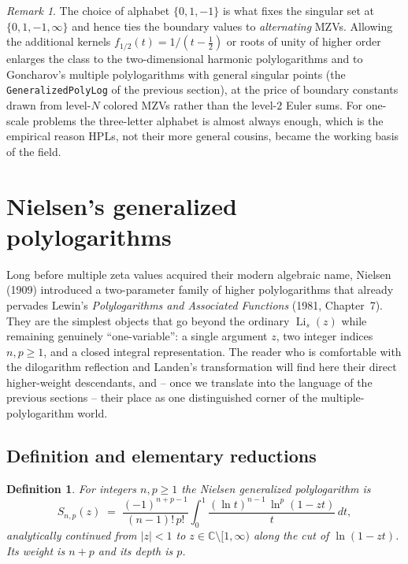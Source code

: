 \documentclass[11pt]{article}
\DeclareMathOperator{\Li}{Li}
\theoremstyle{plain}
\newtheorem{definition}[theorem]{Definition}
\theoremstyle{remark}
\newtheorem{remark}[theorem]{Remark}
\begin{document}
\begin{remark}
The choice of alphabet $\{0,1,-1\}$ is what fixes the singular set at $\{0,1,-1,\infty\}$ and hence ties the boundary values to \emph{alternating} MZVs. Allowing the additional kernels $f_{1/2}(t)=1/(t-\tfrac12)$ or roots of unity of higher order enlarges the class to the two-dimensional harmonic polylogarithms and to Goncharov's multiple polylogarithms with general singular points (the \texttt{GeneralizedPolyLog} of the previous section), at the price of boundary constants drawn from level-$N$ colored MZVs rather than the level-$2$ Euler sums. For one-scale problems the three-letter alphabet is almost always enough, which is the empirical reason HPLs, not their more general cousins, became the working basis of the field.
\end{remark}


\section{Nielsen's generalized polylogarithms}

Long before multiple zeta values acquired their modern algebraic name, Nielsen (1909) introduced a two-parameter family of higher polylogarithms that already pervades Lewin's \emph{Polylogarithms and Associated Functions} (1981, Chapter~7). They are the simplest objects that go beyond the ordinary $\Li_s(z)$ while remaining genuinely ``one-variable'': a single argument $z$, two integer indices $n,p\ge1$, and a closed integral representation. The reader who is comfortable with the dilogarithm reflection and Landen's transformation will find here their direct higher-weight descendants, and -- once we translate into the language of the previous sections -- their place as one distinguished corner of the multiple-polylogarithm world.

\subsection{Definition and elementary reductions}

\begin{definition}
For integers $n,p\ge1$ the \emph{Nielsen generalized polylogarithm} is
\begin{equation}\label{eq:nielsen-def}
  S_{n,p}(z)\;=\;\frac{(-1)^{n+p-1}}{(n-1)!\,p!}\int_0^1 \frac{(\ln t)^{n-1}\,\ln^{p}(1-zt)}{t}\,dt ,
\end{equation}
analytically continued from $|z|<1$ to $z\in\mathbb{C}\setminus[1,\infty)$ along the cut of $\ln(1-zt)$. Its \emph{weight} is $n+p$ and its \emph{depth} is $p$.
\end{definition}
\end{document}
